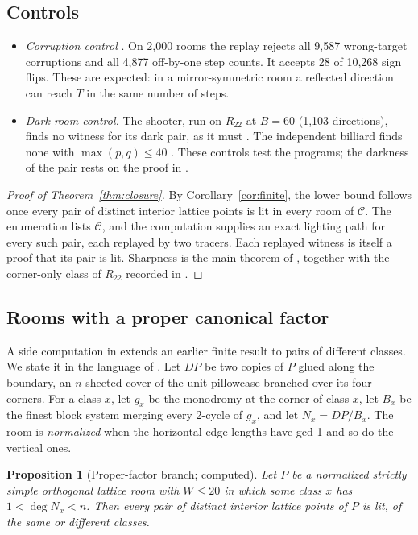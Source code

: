 \documentclass[11pt]{article}
\newtheorem{proposition}{Proposition}
\theoremstyle{definition}
\theoremstyle{remark}
\begin{document}
\subsection{Controls}
\begin{itemize}
\item \emph{Corruption control} \cite[\S2]{d102}. On 2{,}000 rooms the
replay rejects all 9{,}587 wrong-target corruptions and all 4{,}877
off-by-one step counts. It accepts 28 of 10{,}268 sign flips. These are
expected: in a mirror-symmetric room a reflected direction can reach $T$
in the same number of steps.
\item \emph{Dark-room control.} The shooter, run on $R_{22}$ at $B=60$
(1{,}103 directions), finds no witness for its dark pair, as it must
\cite{qreadme}. The independent billiard finds none with
$\max(p,q)\le40$ \cite[\S11]{results}. These controls test the programs;
the darkness of the pair rests on the proof in \cite{q22}.
\end{itemize}

\begin{proof}[Proof of Theorem~\ref{thm:closure}]
By Corollary~\ref{cor:finite}, the lower bound follows once every pair of
distinct interior lattice points is lit in every room of $\mathcal C$. The
enumeration lists $\mathcal C$, and the computation supplies an exact
lighting path for every such pair, each replayed by two tracers. Each
replayed witness is itself a proof that its pair is lit. Sharpness is the
main theorem of \cite{q22}, together with the corner-only class of
$R_{22}$ recorded in \cite[\S3]{d97}.
\end{proof}

\subsection{Rooms with a proper canonical factor}
A side computation in \cite{qreadme} extends an earlier finite result to
pairs of different classes. We state it in the language of
\cite[\S2.3--2.5]{results}. Let $DP$ be two copies of $P$ glued
along the boundary, an $n$-sheeted cover of the unit pillowcase branched
over its four corners. For a class $x$, let $g_x$ be the monodromy at the
corner of class $x$, let $B_x$ be the finest block system merging every
2-cycle of $g_x$, and let $N_x=DP/B_x$. The room is \emph{normalized} when
the horizontal edge lengths have gcd 1 and so do the vertical ones.

\begin{proposition}[Proper-factor branch; computed]\label{prop:proper}
Let $P$ be a normalized strictly simple orthogonal lattice room with
$W\le20$ in which some class $x$ has $1<\deg N_x<n$. Then every pair of
distinct interior lattice points of $P$ is lit, of the same or different
classes.
\end{proposition}
\end{document}
